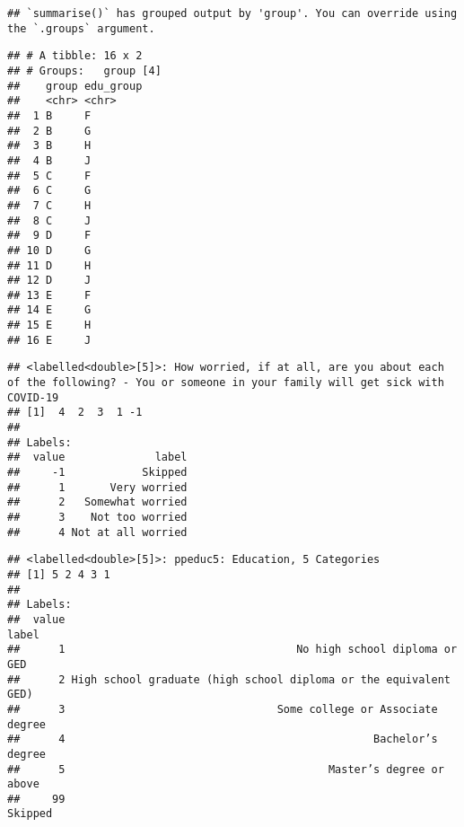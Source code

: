 \documentclass[
]{article}
\newenvironment{Shaded}{\begin{snugshade}}{\end{snugshade}}
\newcommand{\CommentTok}[1]{\textcolor[rgb]{0.56,0.35,0.01}{\textit{#1}}}
\newcommand{\FunctionTok}[1]{\textcolor[rgb]{0.00,0.00,0.00}{#1}}
\newcommand{\NormalTok}[1]{#1}
\newcommand{\SpecialCharTok}[1]{\textcolor[rgb]{0.00,0.00,0.00}{#1}}
\begin{document}
\begin{verbatim}
## `summarise()` has grouped output by 'group'. You can override using the `.groups` argument.
\end{verbatim}

\begin{verbatim}
## # A tibble: 16 x 2
## # Groups:   group [4]
##    group edu_group
##    <chr> <chr>    
##  1 B     F        
##  2 B     G        
##  3 B     H        
##  4 B     J        
##  5 C     F        
##  6 C     G        
##  7 C     H        
##  8 C     J        
##  9 D     F        
## 10 D     G        
## 11 D     H        
## 12 D     J        
## 13 E     F        
## 14 E     G        
## 15 E     H        
## 16 E     J
\end{verbatim}

\begin{Shaded}
\end{Shaded}

\begin{verbatim}
## <labelled<double>[5]>: How worried, if at all, are you about each of the following? - You or someone in your family will get sick with COVID-19
## [1]  4  2  3  1 -1
## 
## Labels:
##  value              label
##     -1            Skipped
##      1       Very worried
##      2   Somewhat worried
##      3    Not too worried
##      4 Not at all worried
\end{verbatim}

\begin{Shaded}
\end{Shaded}

\begin{verbatim}
## <labelled<double>[5]>: ppeduc5: Education, 5 Categories
## [1] 5 2 4 3 1
## 
## Labels:
##  value                                                            label
##      1                                    No high school diploma or GED
##      2 High school graduate (high school diploma or the equivalent GED)
##      3                                 Some college or Associate degree
##      4                                                Bachelor’s degree
##      5                                         Master’s degree or above
##     99                                                          Skipped
\end{verbatim}
\end{document}
